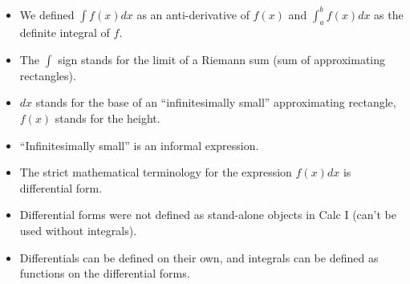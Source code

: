 \begin{frame}
\begin{itemize}
\item We defined $\int f(x) dx$ as an anti-derivative of $f(x)$ and $\int_{a} ^b f(x)dx $ as the definite integral of $f$.
\item The $\int$ sign stands for the limit of a Riemann sum (sum of approximating rectangles).
\item $dx$ stands for the base of an ``infinitesimally small'' approximating rectangle, $f(x)$ stands for the height.
\item ``Infinitesimally small'' is an informal expression. 
\item The strict mathematical terminology for the expression $f(x) dx$
is differential form.
\item Differential forms were not defined as stand-alone objects in Calc I (can't be used without integrals).
\item Differentials can be defined on their own, and integrals can be defined as functions on the differential forms. 
\end{itemize}
\end{frame}

